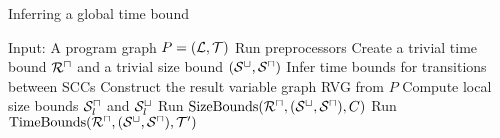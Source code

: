 \begin{algorithm}
\caption{Inferring a global time bound}\label{complete_algorithm}
\begin{algorithmic}[1]
  \State Input: A program graph $P = (\mathcal{L}, \mathcal{T})$
  \State Run preprocessors
  \State Create a trivial time bound ${\mathcal{R}^\sqcap}$ and a trivial size bound ${({\mathcal{S}^\sqcup}, {\mathcal{S}^\sqcap})}$
  \State Infer time bounds for transitions between SCCs
  \State Construct the result variable graph RVG from $P$
  \State Compute local size bounds ${\mathcal{S}^\sqcap_l}$ and ${\mathcal{S}^\sqcup_l}$
  \Repeat
      \State Run $\text{SizeBounds}({\mathcal{R}^\sqcap}, {({\mathcal{S}^\sqcup}, {\mathcal{S}^\sqcap})}, C)$
    \EndFor
      \State Run $\text{TimeBounds}({\mathcal{R}^\sqcap}, {({\mathcal{S}^\sqcup}, {\mathcal{S}^\sqcap})}, \mathcal{T}')$
    \EndFor
\end{algorithmic}
\end{algorithm}
